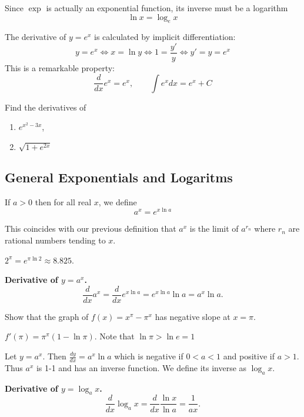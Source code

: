 \documentclass[../calc1-main.tex]{subfiles}
\begin{document}

  Since $\exp$ is actually an exponential function, its inverse must be a logarithm
  \[
    \ln x = \log_e x
  \]

  The derivative of $y = e^x$ is calculated by implicit differentiation:
  \[
    y = e^x \iff
    x = \ln y \iff
    1 = \frac{y'}{y} \iff
    y' = y = e^x
  \]
  This is a remarkable property:
  \[
    \frac{d}{dx} e^x = e^x, \qquad \int e^x dx = e^x + C
  \]

  \begin{example}
    Find the derivatives of
    \begin{enumerate}
      \item $e^{x^2-3x}$,
      \item $\sqrt{1+e^{2x}}$
    \end{enumerate}
  \end{example}

  \subsection*{General Exponentials and Logaritms}
  \begin{definition}
    If $a>0$ then for all real $x$, we define
    \[
      a^x = e^{x \ln a}
    \]
  \end{definition}
  This coincides with our previous definition that $a^x$ is the limit of $a^{r_n}$ where $r_n$ are rational numbers tending to $x$.

  \begin{example}
    $2^{\pi} = e^{\pi \ln 2} \approx 8.825$.
  \end{example}

  \textbf{Derivative of $y=a^x$.}
  \[
    \frac{d}{dx} a^x = \frac{d}{dx} e^{x \ln a} = e^{x \ln a} \ln a = a^x \ln a.
  \]

  \begin{example}
    Show that the graph of $f(x) = x^{\pi} - \pi^x$ has negative slope at $x = \pi$.
  \end{example}
  \begin{solution}
    $f'(\pi) = \pi^{\pi} (1- \ln \pi)$. Note that $\ln \pi > \ln e = 1$
  \end{solution}

  \begin{definition}
    Let $y = a^x$. Then $\frac{dy}{dx} = a^x \ln a$ which is negative if $0<a<1$ and positive if $a>1$. Thus $a^x$ is 1-1 and has an inverse function. We define its inverse as $\log_a x$.
  \end{definition}
  \textbf{Derivative of $y=\log_a x$.}
  \[
    \frac{d}{dx} \log_a x = \frac{d}{dx} \frac{\ln x}{\ln a} = \frac{1}{a x}.
  \]
\end{document}
